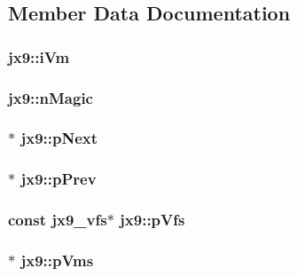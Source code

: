 \subsection{Member Data Documentation}
\hypertarget{structjx9_adb5f0cb196285304e100d75d284930a4}{
\subsubsection[{i\-Vm}]{ jx9\-::i\-Vm}}\label{d4/da4/structjx9_adb5f0cb196285304e100d75d284930a4}
\hypertarget{structjx9_a1d138dfc6c945e0bc368c84b6681b024}{
\subsubsection[{n\-Magic}]{ jx9\-::n\-Magic}}\label{d4/da4/structjx9_a1d138dfc6c945e0bc368c84b6681b024}
\hypertarget{structjx9_acb1d5d2fbd43755e85393feb979def92}{
\subsubsection[{p\-Next}]{$\ast$ jx9\-::p\-Next}}\label{d4/da4/structjx9_acb1d5d2fbd43755e85393feb979def92}
\hypertarget{structjx9_a2793861109a20981e620f3f61e875d25}{
\subsubsection[{p\-Prev}]{ $\ast$ jx9\-::p\-Prev}}\label{d4/da4/structjx9_a2793861109a20981e620f3f61e875d25}
\hypertarget{structjx9_af8c57e958146bf8a2d29f3ed938630e6}{
\subsubsection[{p\-Vfs}]{\setlength{\rightskip}{0pt plus 5cm}const {\bf jx9\-\_\-vfs}$\ast$ jx9\-::p\-Vfs}}\label{d4/da4/structjx9_af8c57e958146bf8a2d29f3ed938630e6}
\hypertarget{structjx9_aa1fe6006c1dbe36c5e9995836d7554a0}{
\subsubsection[{p\-Vms}]{$\ast$ jx9\-::p\-Vms}}\label{d4/da4/structjx9_aa1fe6006c1dbe36c5e9995836d7554a0}
